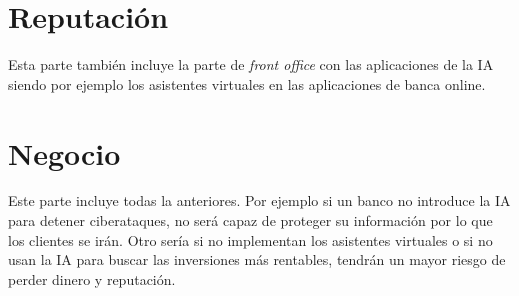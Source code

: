 \documentclass[12pt, a4paper]{report}
\begin{document}
\section{Reputación}
Esta parte también incluye la parte de \textit{front office} con las aplicaciones de la IA siendo por ejemplo los asistentes virtuales en las aplicaciones de banca online.
\section{Negocio}
Este parte incluye todas la anteriores. Por ejemplo si un banco no introduce la IA para detener ciberataques, no será capaz de proteger su información por lo que los clientes se irán. Otro sería si no implementan los asistentes virtuales o si no usan la IA para buscar las inversiones más rentables, tendrán un mayor riesgo de perder dinero y reputación.
\end{document}
